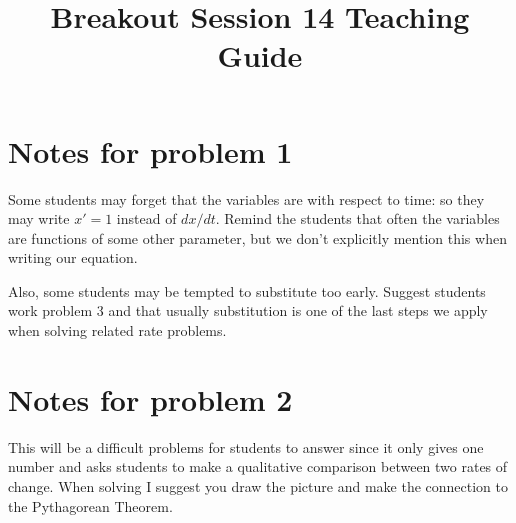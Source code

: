 \documentclass[handout,nooutcomes]{ximera}
\title{Breakout Session 14 Teaching Guide}
\begin{document}
\begin{abstract}

  
\end{abstract}
\maketitle

\section{Notes for problem 1}
Some students may forget that the variables are with respect to time: so they may write $x' = 1$ instead of $dx/dt$.
Remind the students that often the variables are functions of some other parameter, but we don’t explicitly mention this when writing our equation.

Also, some students may be tempted to substitute too early.
Suggest students work problem 3 and that usually substitution is one of the last steps we apply when solving related rate problems.

\section{Notes for problem 2}
This will be a difficult problems for students to answer since it only gives one number and asks students to make a qualitative comparison between two rates of change.
When solving I suggest you draw the picture and make the connection to the Pythagorean Theorem.
\end{document}
